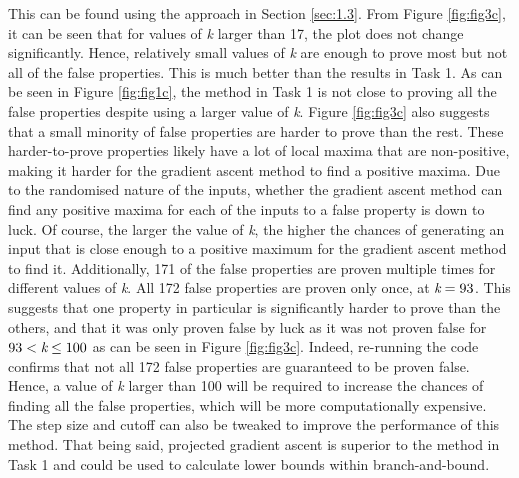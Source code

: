 \documentclass[11pt]{article}
\begin{document}
This can be found using the approach in Section \ref{sec:1.3}. From Figure \ref{fig:fig3c}, it can be seen that for values of \emph{k} larger than 17, the plot does not change significantly. Hence, relatively small values of \emph{k} are enough to prove most but not all of the false properties. This is much better than the results in Task 1. As can be seen in Figure \ref{fig:fig1c}, the method in Task 1 is not close to proving all the false properties despite using a larger value of \emph{k}. Figure \ref{fig:fig3c} also suggests that a small minority of false properties are harder to prove than the rest. These harder-to-prove properties likely have a lot of local maxima that are non-positive, making it harder for the gradient ascent method to find a positive maxima. Due to the randomised nature of the inputs, whether the gradient ascent method can find any positive maxima for each of the inputs to a false property is down to luck. Of course, the larger the value of \emph{k}, the higher the chances of generating an input that is close enough to a positive maximum for the gradient ascent method to find it. Additionally, 171 of the false properties are proven multiple times for different values of \emph{k}. All 172 false properties are proven only once, at $\emph{k}=93$. This suggests that one property in particular is significantly harder to prove than the others, and that it was only proven false by luck as it was not proven false for $93<\emph{k}\leq100$ as can be seen in Figure \ref{fig:fig3c}. Indeed, re-running the code confirms that not all 172 false properties are guaranteed to be proven false. Hence, a value of \emph{k} larger than 100 will be required to increase the chances of finding all the false properties, which will be more computationally expensive. The step size and cutoff can also be tweaked to improve the performance of this method. That being said, projected gradient ascent is superior to the method in Task 1 and could be used to calculate lower bounds within branch-and-bound.
\end{document}
